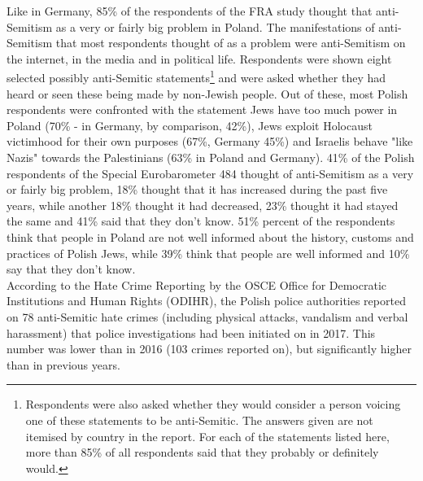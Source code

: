 Like in Germany, 85\% of the respondents of the FRA study thought that anti-Semitism as a very or fairly big problem in Poland. The manifestations of anti-Semitism that most respondents thought of as a problem were anti-Semitism on the internet, in the media and in political life. Respondents were shown eight selected possibly anti-Semitic statements\footnote{Respondents were also asked whether they would consider a person voicing one of these statements to be anti-Semitic. The answers given are not itemised by country in the report. For each of the statements listed here, more than 85\% of all respondents said that they probably or definitely would.} and were asked whether they had heard or seen these being made by non-Jewish people. Out of these, most Polish respondents were confronted with the statement Jews have too much power in Poland (70\% - in Germany, by comparison, 42\%), Jews exploit Holocaust victimhood for their own purposes (67\%, Germany 45\%) and Israelis behave "like Nazis" towards the Palestinians (63\% in Poland and Germany). 41\% of the Polish respondents of the Special Eurobarometer 484 thought of anti-Semitism as a very or fairly big problem, 18\% thought that it has increased during the past five years, while another 18\% thought it had decreased, 23\% thought it had stayed the same and 41\% said that they don’t know. 51\% percent of the respondents think that people in Poland are not well informed about the history, customs and practices of Polish Jews, while 39\% think that people are well informed and 10\% say that they don't know. \\ According to the Hate Crime Reporting by the OSCE Office for Democratic Institutions and Human Rights (ODIHR), the Polish police authorities reported on 78 anti-Semitic hate crimes (including physical attacks, vandalism and verbal harassment) that police investigations had been initiated on in 2017. This number was lower than in 2016 (103 crimes reported on), but significantly higher than in previous years. 
